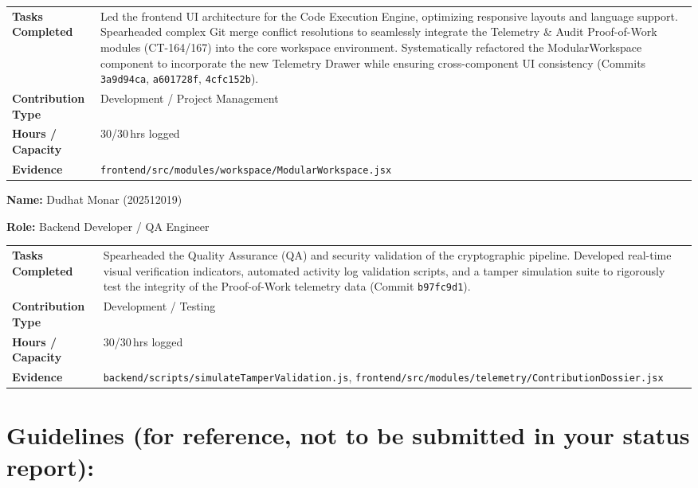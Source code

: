 \documentclass[11pt,a4paper]{article}
\newcommand{\field}[2]{\textbf{#1:} #2\par}
\begin{document}
\vspace{4pt}
{\small
\begin{tabular}{>{\bfseries}p{} p{}}
\toprule
Tasks Completed & Led the frontend UI architecture for the Code Execution Engine, optimizing responsive layouts and language support. Spearheaded complex Git merge conflict resolutions to seamlessly integrate the Telemetry \& Audit Proof-of-Work modules (CT-164/167) into the core workspace environment. Systematically refactored the ModularWorkspace component to incorporate the new Telemetry Drawer while ensuring cross-component UI consistency (Commits \texttt{3a9d94ca}, \texttt{a601728f}, \texttt{4cfc152b}). \\
Contribution Type & Development / Project Management \\
Hours / Capacity & 30/30\,hrs logged \\
Evidence & \texttt{frontend/src/modules/workspace/ModularWorkspace.jsx} \\
\bottomrule
\end{tabular}
}

\vspace{6pt}

\field{Name}{Dudhat Monar (202512019)}
\field{Role}{Backend Developer / QA Engineer}

\vspace{4pt}
{\small
\begin{tabular}{>{\bfseries}p{} p{}}
\toprule
Tasks Completed & Spearheaded the Quality Assurance (QA) and security validation of the cryptographic pipeline. Developed real-time visual verification indicators, automated activity log validation scripts, and a tamper simulation suite to rigorously test the integrity of the Proof-of-Work telemetry data (Commit \texttt{b97fc9d1}). \\
Contribution Type & Development / Testing \\
Hours / Capacity & 30/30\,hrs logged \\
Evidence & \texttt{backend/scripts/simulateTamperValidation.js}, \texttt{frontend/src/modules/telemetry/ContributionDossier.jsx} \\
\bottomrule
\end{tabular}
}

\pagebreak

\section{Guidelines (for reference, not to be submitted in your status report):}
\end{document}
